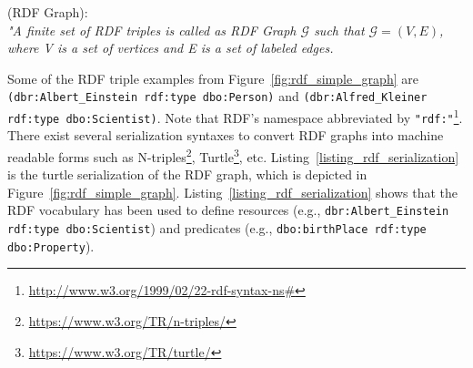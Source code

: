 \theoremstyle{definition}
\begin{definition}{(RDF Graph):\\}
\textit{"A finite set of RDF triples is called as RDF Graph $\mathcal{G}$ such that $\mathcal{G}=(V, E)$, where V is a set of vertices and E is a set of labeled edges.}
\end{definition}
\theoremstyle{definition}

Some of the RDF triple examples from Figure~\ref{fig:rdf_simple_graph} are \texttt{(dbr:Albert\_Einstein rdf:type dbo:Person)} and \texttt{(dbr:Alfred\_Kleiner rdf:type dbo:Scientist)}. Note that RDF's namespace abbreviated by \texttt{"rdf:"}\footnote{\url{http://www.w3.org/1999/02/22-rdf-syntax-ns#}}. There exist several serialization syntaxes to convert RDF graphs into machine readable forms such as N-triples\footnote{\url{https://www.w3.org/TR/n-triples/}}, Turtle\footnote{\url{https://www.w3.org/TR/turtle/}}, etc. Listing~\ref{listing_rdf_serialization} is the turtle serialization of the RDF graph, which is depicted in Figure~\ref{fig:rdf_simple_graph}.  Listing~\ref{listing_rdf_serialization} shows that the RDF vocabulary has been used to define resources (e.g., \texttt{dbr:Albert\_Einstein rdf:type dbo:Scientist}) and predicates (e.g., \texttt{dbo:birthPlace rdf:type dbo:Property}).


